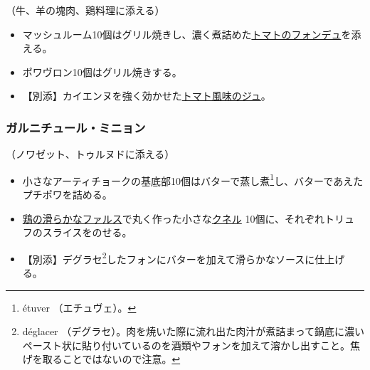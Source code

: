 \begin{recette}


（牛、羊の塊肉、鶏料理に添える）

\begin{itemize}
\item
  マッシュルーム10個はグリル焼きし、濃く煮詰めた\protect\hyperlink{portugaise}{トマトのフォンデュ}を添える。
\item
  ポワヴロン10個はグリル焼きする。
\item
  【別添】カイエンヌを強く効かせた\protect\hyperlink{jus-lie-tomate}{トマト風味のジュ}。
\end{itemize}

\atoaki{}

\hypertarget{garniture-mignon}{%
\subsubsection{ガルニチュール・ミニョン}\label{garniture-mignon}}



（ノワゼット、トゥルヌドに添える）

\begin{itemize}
\item
  小さなアーティチョークの基底部10個はバターで蒸し煮\footnote{étuver
    （エチュヴェ）。}し、バターであえたプチポワを詰める。
\item
  \protect\hyperlink{farce-b}{鶏の滑らかなファルス}で丸く作った小さな\protect\hyperlink{quenelles-diverses}{クネル}
  10個に、それぞれトリュフのスライスをのせる。
\item
  【別添】デグラセ\footnote{déglacer
    （デグラセ）。肉を焼いた際に流れ出た肉汁が煮詰まって鍋底に濃いペースト状に貼り付いているのを酒類やフォンを加えて溶かし出すこと。焦げを取ることではないので注意。}したフォンにバターを加えて滑らかなソースに仕上げる。
\end{itemize}

\atoaki{}

\hypertarget{garniture-milanaise}{%
}
\end{recette}
